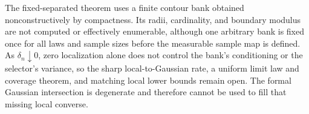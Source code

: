 The fixed-separated theorem uses a finite contour bank obtained nonconstructively by compactness. Its radii, cardinality, and boundary modulus are not computed or effectively enumerable, although one arbitrary bank is fixed once for all laws and sample sizes before the measurable sample map is defined. As \(\delta_n\downarrow0\), zero localization alone does not control the bank's conditioning or the selector's variance, so the sharp local-to-Gaussian rate, a uniform limit law and coverage theorem, and matching local lower bounds remain open. The formal Gaussian intersection is degenerate and therefore cannot be used to fill that missing local converse.